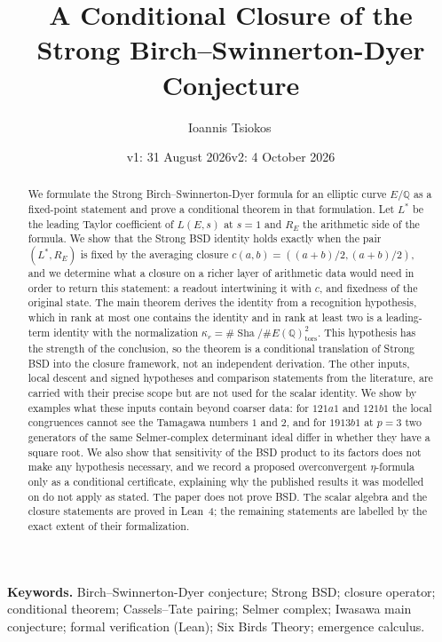\documentclass[11pt]{article}
\title{A Conditional Closure of the Strong Birch--Swinnerton-Dyer Conjecture}
\author{Ioannis Tsiokos\,\orcidlink{0009-0009-7659-5964}}
\date{v1: 31 August 2026\quad\textperiodcentered\quad v2: 4 October 2026}
\theoremstyle{definition}
\newcommand{\Q}{\mathbb{Q}}
\newcommand{\Sha}{\operatorname{Sha}}
\begin{document}
\maketitle
\thispagestyle{firstpage}

\begin{abstract}
We formulate the Strong Birch--Swinnerton-Dyer formula for an elliptic
curve $E/\Q$ as a fixed-point statement and prove a conditional theorem
in that formulation.  Let $L^*$ be the leading Taylor coefficient of
$L(E,s)$ at $s=1$ and $R_E$ the arithmetic side of the formula.  We show
that the Strong BSD identity holds exactly when the pair $(L^*,R_E)$ is
fixed by the averaging closure $c(a,b)=((a+b)/2,(a+b)/2)$, and we
determine what a closure on a richer layer of arithmetic data would need
in order to return this statement: a readout intertwining it with $c$,
and fixedness of the original state.  The main theorem derives the
identity from a recognition hypothesis, which in rank at most one
contains the identity and in rank at least two is a leading-term
identity with the normalization
$\kappa_r=\#\Sha/\#E(\Q)_{\mathrm{tors}}^2$.  This hypothesis has the
strength of the conclusion, so the theorem is a conditional translation
of Strong BSD into the closure framework, not an independent derivation.
The other inputs, local descent and signed hypotheses and comparison
statements from the literature, are carried with their precise scope
but are not used for the scalar identity.  We show by examples what these
inputs contain beyond coarser data: for $121a1$ and $121b1$ the local
congruences cannot see the Tamagawa numbers $1$ and $2$, and for $1913b1$
at $p=3$ two generators of the same Selmer-complex determinant ideal
differ in whether they have a square root.  We also show that sensitivity
of the BSD product to its factors does not make any hypothesis necessary,
and we record a proposed overconvergent $\eta$-formula only as a
conditional certificate, explaining why the published results it was
modelled on do not apply as stated.  The paper does not prove BSD.  The
scalar algebra and the closure statements are proved in Lean~4; the
remaining statements are labelled by the exact extent of their
formalization.
\end{abstract}

\medskip
\noindent\textbf{Keywords.} Birch--Swinnerton-Dyer conjecture; Strong BSD;
closure operator; conditional theorem; Cassels--Tate pairing; Selmer
complex; Iwasawa main conjecture; formal verification (Lean); Six Birds
Theory; emergence calculus.
\end{document}
